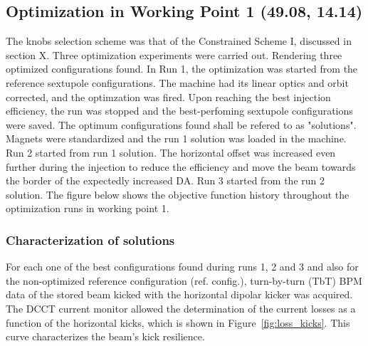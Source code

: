 \subsection{Optimization in Working Point 1 (49.08, 14.14)}
The knobs selection scheme was that of the Constrained Scheme I, discussed in section X. Three optimization experiments were carried out. Rendering three optimized configurations found. In Run 1, the optimization was started from the reference sextupole configurations. The machine had its linear optics and orbit corrected, and the optimzation was fired. Upon reaching the best injection efficiency, the run was stopped and the best-perfoming sextupole configurations were saved. The optimum configurations found shall be refered to as "solutions". Magnets were standardized and the run 1 solution was loaded in the machine. Run 2  started from run 1 solution. The horizontal offset was increased even further during the injection to reduce the efficiency and move the beam towards the border of the expectedly increased DA. Run 3 started from the run 2 solution. The figure below shows the objective function history throughout the optimization runs in working point 1.
\subsubsection{Characterization of solutions}
For each one of the best configurations found during runs 1, 2 and 3 and also for the non-optimized reference configuration (ref. config.), turn-by-turn (TbT) BPM data of the stored beam kicked with the horizontal dipolar kicker was acquired. The DCCT current monitor allowed the determination of the current losses as a function of the horizontal kicks, which is shown in Figure~\ref{fig:loss_kicks}. This curve characterizes the beam's kick resilience.

